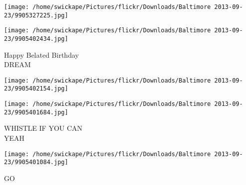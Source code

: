 \documentclass[10pt,letterpaper]{article}
\begin{document}
\texttt{[image: /home/swickape/Pictures/flickr/Downloads/Baltimore 2013-09-23/9905327225.jpg]}

\vspace{0.25in}
\texttt{[image: /home/swickape/Pictures/flickr/Downloads/Baltimore 2013-09-23/9905402434.jpg]}

Happy Belated Birthday\\
DREAM
\pagebreak

\texttt{[image: /home/swickape/Pictures/flickr/Downloads/Baltimore 2013-09-23/9905402154.jpg]}

\vspace{0.25in}
\texttt{[image: /home/swickape/Pictures/flickr/Downloads/Baltimore 2013-09-23/9905401684.jpg]}

WHISTLE IF YOU CAN\\
YEAH
\pagebreak

\texttt{[image: /home/swickape/Pictures/flickr/Downloads/Baltimore 2013-09-23/9905401084.jpg]}

GO
\pagebreak
\end{document}
